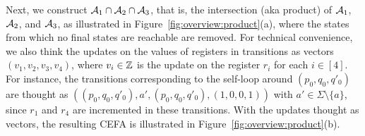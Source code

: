 Next, 
we construct $\mathcal{A}_1 \cap \mathcal{A}_2 \cap \mathcal{A}_3$, that is, the intersection (aka product) of $\mathcal{A}_1$, $\mathcal{A}_2$, and $\mathcal{A}_3$, as illustrated in Figure~\ref{fig:overview:product}(a), where the states from which no final states are reachable are removed. 
For technical convenience, we also think  the updates on the values of registers in transitions as vectors $(v_1, v_2, v_3, v_4)$, where $v_i \in \mathbb{Z}$ is the update on the register $r_{i}$ for each $i \in [4]$. For instance, the transitions corresponding to the self-loop around $(p_0, q_0, q'_0)$ are thought as $((p_0, q_0, q'_0), a', (p_0, q_0, q'_0), (1,0,0,1))$ with $a' \in \Sigma \setminus \{a\}$, since $r_1$ and $r_4$ are incremented in these transitions. With the updates thought  as vectors, the resulting CEFA is illustrated in Figure~\ref{fig:overview:product}(b).

